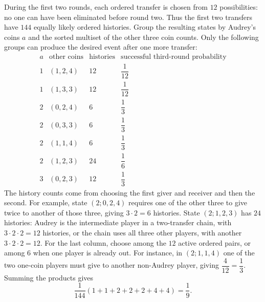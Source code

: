 During the first two rounds, each ordered transfer is chosen from $12$ possibilities: no one can have been eliminated before round two. Thus the first two transfers have $144$ equally likely ordered histories.
Group the resulting states by Audrey's coins $a$ and the sorted multiset of the other three coin counts. Only the following groups can produce the desired event after one more transfer:
\[
\begin{array}{c|c|r|c}
a&\text{other coins}&\text{histories}&\text{successful third-round probability}\\ \hline
1&(1,2,4)&12&\dfrac{1}{12}\\
1&(1,3,3)&12&\dfrac{1}{12}\\
2&(0,2,4)&6&\dfrac{1}{3}\\
2&(0,3,3)&6&\dfrac{1}{3}\\
2&(1,1,4)&6&\dfrac{1}{3}\\
2&(1,2,3)&24&\dfrac{1}{6}\\
3&(0,2,3)&12&\dfrac{1}{3}
\end{array}
\]
The history counts come from choosing the first giver and receiver and then the second. For example, state $(2;0,2,4)$ requires one of the other three to give twice to another of those three, giving $3\cdot2=6$ histories. State $(2;1,2,3)$ has $24$ histories: Audrey is the intermediate player in a two-transfer chain, with $3\cdot2\cdot2=12$ histories, or the chain uses all three other players, with another $3\cdot2\cdot2=12$.
For the last column, choose among the $12$ active ordered pairs, or among $6$ when one player is already out. For instance, in $(2;1,1,4)$ one of the two one-coin players must give to another non-Audrey player, giving $\dfrac{4}{12}=\dfrac{1}{3}$.
Summing the products gives
\[
\dfrac{1}{144}(1+1+2+2+2+4+4)=\boxed{\dfrac{1}{9}}.
\]
